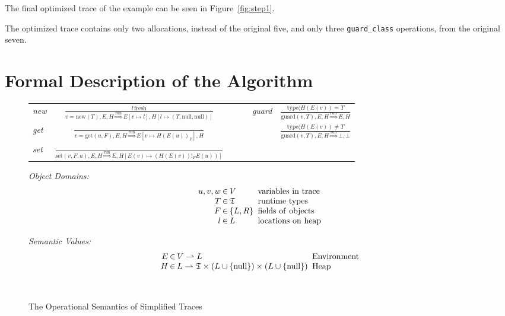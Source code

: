 \documentclass{sigplanconf}
\begin{document}
The final optimized trace of the example can be seen in
Figure~\ref{fig:step1}.

The optimized trace contains only two allocations, instead of the original five,
and only three \texttt{guard\_class} operations, from the original seven.

\section{Formal Description of the Algorithm}
\label{sec:formal}


\begin{figure}
\begin{center}
\begin{tabular}{lcccc}
\emph{new} & ${\displaystyle \frac{l\,\mathrm{fresh}}{v=\mathrm{new}(T),E,H\overset{\mathrm{run}}{\Longrightarrow}E\left[v\mapsto l\right],H\left[l\mapsto\left(T,\mathrm{null},\mathrm{null}\right)\right]}}$ & ~~~ &
\emph{guard} & ${\displaystyle \frac{\mathrm{type}(H(E(v))=T}{\mathrm{guard}(v,T),E,H\overset{\mathrm{run}}{\Longrightarrow}E,H}}$\tabularnewline[3em]
\emph{get} & ${\displaystyle \frac{\,}{v=\mathrm{get}(u,F),E,H\overset{\mathrm{run}}{\Longrightarrow}E\left[v\mapsto H\left(E\left(u\right)\right)_{F}\right],H}}$ & ~~~ &
& ${\displaystyle \frac{\mathrm{type}(H(E(v))\neq T}{\mathrm{guard}(v,T),E,H\overset{\mathrm{run}}{\Longrightarrow}\bot,\bot}}$\tabularnewline[3em]
\emph{set} & ${\displaystyle \frac{\,}{\mathrm{set}\left(v,F,u\right),E,H\overset{\mathrm{run}}{\Longrightarrow}E,H\left[E\left(v\right)\mapsto\left(H\left(E\left(v\right)\right)!_{F}E(u)\right)\right]}}$ & ~~~ &
& \tabularnewline[4em]
\end{tabular}

\begin{minipage}[b]{7 cm}
\emph{Object Domains:}
$$\setlength\arraycolsep{0.1em}
 \begin{array}{rcll}
    u,v,w & \in & V & \mathrm{\ variables\ in\ trace}\\
    T & \in & \mathfrak{T} & \mathrm{\ runtime\ types}\\
    F & \in & \left\{ L,R\right\} & \mathrm{\ fields\ of\ objects}\\
    l & \in & L & \mathrm{\ locations\ on\ heap}
 \end{array}
$$
\end{minipage}
\begin{minipage}[b]{5 cm}
\emph{Semantic Values:}
$$\setlength\arraycolsep{0.1em}
 \begin{array}{rcll}
    E & \in & V\rightharpoonup L & \mathrm{\ Environment}\\
    H & \in & L\rightharpoonup\mathfrak{T}\times(L\cup \{ \mathrm{null} \})\times (L\cup \{ \mathrm{null}\} ) & \mathrm{\ Heap}\\
    \\
    \\
 \end{array}
$$
\end{minipage}
\end{center}
\label{fig:semantics}
\caption{The Operational Semantics of Simplified Traces}
\end{figure}
\end{document}
